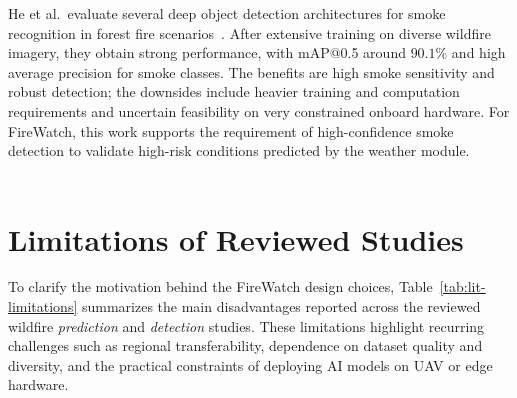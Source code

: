 He et al.\ evaluate several deep object detection architectures for smoke recognition in forest fire scenarios~\cite{he2025}. After extensive training on diverse wildfire imagery, they obtain strong performance, with mAP@0.5 around $90.1\%$ and high average precision for smoke classes. The benefits are high smoke sensitivity and robust detection; the downsides include heavier training and computation requirements and uncertain feasibility on very constrained onboard hardware. For FireWatch, this work supports the requirement of high-confidence smoke detection to validate high-risk conditions predicted by the weather module.
\\ \\

\section{Limitations of Reviewed Studies}

To clarify the motivation behind the FireWatch design choices, Table~\ref{tab:lit-limitations}
summarizes the main disadvantages reported across the reviewed wildfire \emph{prediction} and
\emph{detection} studies. These limitations highlight recurring challenges such as regional
transferability, dependence on dataset quality and diversity, and the practical constraints of
deploying AI models on UAV or edge hardware.

